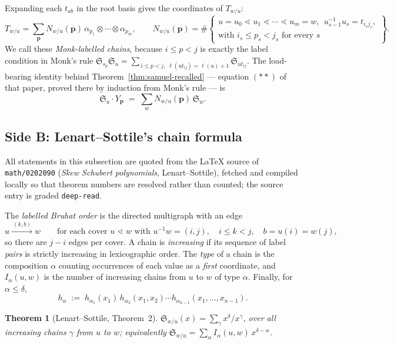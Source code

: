 \documentclass[11pt]{article}
\theoremstyle{plain}
\newtheorem{theorem}{Theorem}[section]
\theoremstyle{definition}
\DeclareMathOperator{\len}{\ell}
\newcommand{\Sch}{\mathfrak{S}}
\newcommand{\pv}{\mathbf{p}}
\begin{document}
Expanding each $t_{ab}$ in the root basis gives the coordinates of $T_{w/u}$:
\begin{equation}\label{eq:Ndef}
  T_{w/u}=\sum_{\pv}N_{w/u}(\pv)\,\alpha_{p_1}\otimes\cdots\otimes\alpha_{p_m},
  \qquad
  N_{w/u}(\pv)=\#\left\{
  \begin{array}{l}
  u=u_0\lessdot u_1\lessdot\cdots\lessdot u_m=w,\ \ u_{s-1}^{-1}u_s=t_{i_sj_s},\\
  \text{with } i_s\le p_s<j_s \text{ for every }s
  \end{array}\right\}.
\end{equation}
We call these \emph{Monk-labelled chains}, because $i\le p<j$ is exactly the
label condition in Monk's rule
$\Sch_{s_p}\Sch_u=\sum_{\,i\le p<j,\;\len(ut_{ij})=\len(u)+1}\Sch_{ut_{ij}}$.
The load-bearing identity behind Theorem~\ref{thm:samuel-recalled} --- equation
$(**)$ of that paper, proved there by induction from Monk's rule --- is
\begin{equation}\label{eq:starstar}
  \Sch_u\cdot Y_\pv \;=\; \sum_{w} N_{w/u}(\pv)\,\Sch_w .
\end{equation}

\subsection{Side B: Lenart--Sottile's chain formula}

All statements in this subsection are quoted from the \LaTeX{} source of
\texttt{math/0202090} (\emph{Skew Schubert polynomials}, Lenart--Sottile),
fetched and compiled locally so that theorem numbers are resolved rather than
counted; the source entry is graded \texttt{deep-read}.

The \emph{labelled Bruhat order} is the directed multigraph with an edge
\[
  u\xrightarrow{\ (k,b)\ }w
  \qquad\text{for each cover } u\lessdot w \text{ with } u^{-1}w=(i,j),
  \quad i\le k<j,\quad b=u(i)=w(j),
\]
so there are $j-i$ edges per cover. A chain is \emph{increasing} if its sequence
of label \emph{pairs} is strictly increasing in lexicographic order. The
\emph{type} of a chain is the composition $\alpha$ counting occurrences of each
value as a \emph{first} coordinate, and $I_\alpha(u,w)$ is the number of
increasing chains from $u$ to $w$ of type $\alpha$. Finally, for
$\alpha\le\delta$,
\[
  h_\alpha \;:=\; h_{\alpha_1}(x_1)\,h_{\alpha_2}(x_1,x_2)\cdots
                  h_{\alpha_{n-1}}(x_1,\dots,x_{n-1}).
\]

\begin{theorem}[Lenart--Sottile, Theorem~2]\label{thm:LS}
$\Sch_{w/u}(x)=\sum_\gamma x^\delta/x^\gamma$, over all increasing chains
$\gamma$ from $u$ to $w$; equivalently
$\Sch_{w/u}=\sum_\alpha I_\alpha(u,w)\,x^{\delta-\alpha}$.
\end{theorem}
\end{document}
